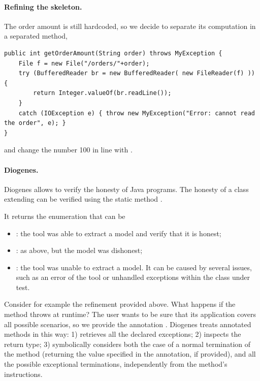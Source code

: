 \paragraph{Refining the skeleton.}
The order amount is still hardcoded, so we decide to separate its computation
in a separated method, \eg
\begin{mdframed}
\begin{verbatim}
public int getOrderAmount(String order) throws MyException {
    File f = new File("/orders/"+order);
    try (BufferedReader br = new BufferedReader( new FileReader(f) )) {
        return Integer.valueOf(br.readLine());        
    }
    catch (IOException e) { throw new MyException("Error: cannot read the order", e); }    
}
\end{verbatim}
\end{mdframed}
and change the number 100 in line  with .

\paragraph{Diogenes.}
Diogenes allows to verify the honesty of Java programs.
The honesty of a class extending  
can be verified using the static method 
.

It returns the enumeration  that can be
\begin{itemize}
\item {}: the tool was able to extract a \coco model and verify that it is honest;
\item {}: as above, but the model was dishonest;
\item {}: the tool was unable to extract a model. 
It can be caused by several issues, such as an error of the 
tool or unhandled exceptions within the class under test.
\end{itemize}

Consider for example the refinement provided above.
What happens if the method throws  at runtime?
The user wants to be sure that its application covers all possible scenarios,
so we provide the annotation .
Diogenes treats annotated methods in this way:
1) retrieves all the declared exceptions;
2) inspects the return type;
3) symbolically considers both the case of a normal termination of the method
(returning the value specified in the annotation, if provided),
and all the possible exceptional terminations, 
independently from the method's instructions.

